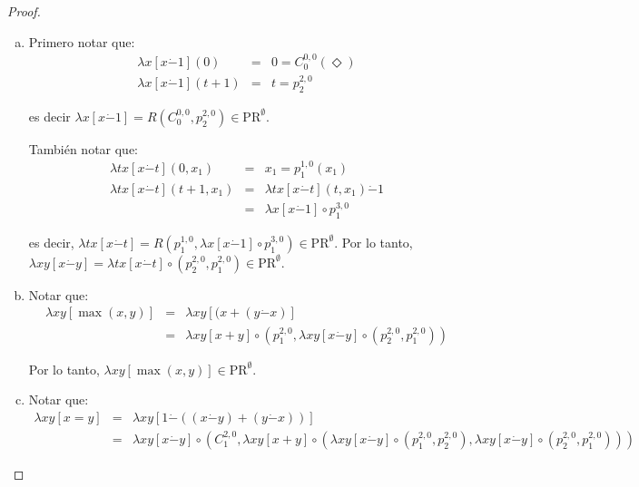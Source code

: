   \begin{proof}
    \begin{enumerate}[a)]
      \item Primero notar que:
        \begin{eqnarray*}
          \lambda x \left[x \dot{-}1\right](0) &=& 0 = C_{0}^{0,0}(\Diamond) \\
          \lambda x \left[x \dot{-}1\right](t+1) &=& t = p_{2}^{2,0}
        \end{eqnarray*}

        \PN es decir $\lambda x \left[x \dot{-}1\right] = R(C_{0}^{0,0}, p_{2}^{2,0}) \in \mathrm{PR}^{\emptyset}$.

        \PN También notar que:
        \begin{eqnarray*}
          \lambda tx \left[x \dot{-}t\right](0, x_{1}) &=& x_{1} = p_{1}^{1,0}(x_{1}) \\
          \lambda tx \left[x \dot{-}t\right](t+1, x_{1}) &=& \lambda tx \left[x \dot{-}t\right](t, x_{1})
            \dot{-} 1\\
          &=& \lambda x \left[x \dot{-}1\right] \circ p_{1}^{3,0}
        \end{eqnarray*}

        \PN es decir, $\lambda tx \left[x \dot{-}t\right] = R(p_{1}^{1,0}, \lambda x \left[x \dot{-}1\right] \circ
        p_{1}^{3,0}) \in \mathrm{PR}^{\emptyset}$.
        \PN Por lo tanto, $\lambda xy \left[x \dot{-}y\right] = \lambda tx \left[x \dot{-}t\right] \circ (p_{2}^{2,0},
        p_{1}^{2,0}) \in \mathrm{PR}^{\emptyset}$.

      \item Notar que:
        \begin{eqnarray*}
          \lambda xy \left[\max (x,y)\right] &=& \lambda xy \left[(x + (y \dot{-}x)\right] \\
          &=& \lambda xy \left[x+y\right] \circ \left(p_{1}^{2,0}, \lambda xy \left[x \dot{-}y\right] \circ
            (p_{2}^{2,0}, p_{1}^{2,0})\right)
        \end{eqnarray*}

        \PN Por lo tanto, $\lambda xy \left[\max (x,y)\right] \in \mathrm{PR}^{\emptyset}$.

      \item Notar que:
        \begin{eqnarray*}
          \lambda xy \left[x=y\right] &=& \lambda xy \left[1 \dot{-}((x \dot{-} y) + (y \dot{-} x))\right] \\
          &=& \lambda xy \left[x \dot{-}y\right] \circ (C_{1}^{2,0}, \lambda xy \left[x+y\right] \circ
            (\lambda xy \left[x \dot{-}y\right] \circ (p_{1}^{2,0}, p_{2}^{2,0}), \lambda xy \left[x \dot{-}y\right]
            \circ (p_{2}^{2,0}, p_{1}^{2,0})))
        \end{eqnarray*}


\end{enumerate}
\end{proof}
